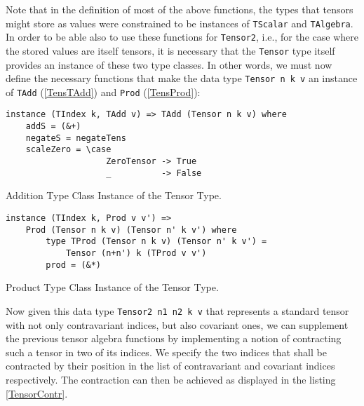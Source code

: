 Note that in the definition of most of the above functions, the types that tensors might store as values were constrained to be instances of \texttt{TScalar} and \texttt{TAlgebra}. 
In order to be able also to use these functions for  \texttt{Tensor2}, i.e., for the case where the stored values are itself tensors, it is necessary that the \texttt{Tensor} type itself provides an instance of these two type classes. In other words, we must now define the necessary functions that make the data type
\texttt{Tensor n k v} an instance of \texttt{TAdd} (\ref{TensTAdd}) and \texttt{Prod} (\ref{TensProd}):

\begin{listing}[hbt!] 
\begin{verbatim}
instance (TIndex k, TAdd v) => TAdd (Tensor n k v) where
    addS = (&+)
    negateS = negateTens
    scaleZero = \case
                    ZeroTensor -> True
                    _          -> False
\end{verbatim}
\caption{Addition Type Class Instance of the Tensor Type.}\label{TensTAdd}
\end{listing}

\begin{listing}[hbt!]
\begin{verbatim}
instance (TIndex k, Prod v v') => 
    Prod (Tensor n k v) (Tensor n' k v') where
        type TProd (Tensor n k v) (Tensor n' k v') = 
            Tensor (n+n') k (TProd v v')
        prod = (&*)
\end{verbatim} 
\caption{Product Type Class Instance of the Tensor Type.}\label{TensProd}
\end{listing}

Now given this data type \texttt{Tensor2 n1 n2 k v} that represents a standard tensor with not only contravariant indices, but also covariant ones, we can supplement the previous tensor algebra functions by implementing a notion of contracting such a tensor in two of its indices.
We specify the two indices that shall be contracted by their position in the list of contravariant and covariant indices respectively. The contraction can then be achieved as displayed in the listing \ref{TensorContr}.

